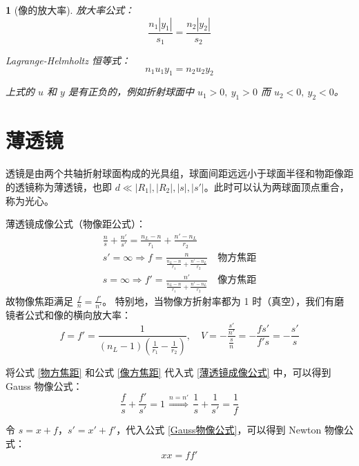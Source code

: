 \documentclass[UTF8]{report}
\theoremstyle{MyLineTheoremStyle} %
\theoremstyle{MyBlockTheoremStyle} %
\theoremstyle{MySubsubsectionStyle} %
\newtheorem{definition}{}
\begin{document}
\begin{definition}[像的放大率]
放大率公式：
\begin{equation}
\frac{n_1 | y_1 |}{s_1} = \frac{n_2 | y_2 |}{s_2}
\end{equation}

Lagrange-Helmholtz 恒等式：
\begin{equation}
n_1u_1y_1 = n_2u_2y_2
\end{equation}

上式的 $u$ 和 $y$ 是有正负的，例如折射球面中 $u_1 > 0,\ y_1 >0$ 而 $u_2 <0,\ y_2 < 0$。

\end{definition}



\section{薄透镜}

透镜是由两个共轴折射球面构成的光具组，球面间距远远小于球面半径和物距像距的透镜称为薄透镜，也即 $d \ll | R_1 |, | R_2 |, | s |, | s' |$。此时可以认为两球面顶点重合，称为光心。

薄透镜成像公式（物像距公式）：
\begin{gather} 
\frac{n}{s} + \frac{n'}{s'} = \frac{n_L - n}{r_1} + \frac{n' - n_L}{r_2} \label{薄透镜成像公式} \\
s' = \infty \Longrightarrow  f = \frac{n}{\frac{n_L - n}{r_1} + \frac{n' - n_L}{r_2}}\quad \text{物方焦距} \label{物方焦距} \\ 
s = \infty \Longrightarrow  f' = \frac{n'}{\frac{n_L - n}{r_1} + \frac{n' - n_L}{r_2}}\quad \text{像方焦距} \label{像方焦距}
\end{gather}
故物像焦距满足 $\frac{f}{n} = \frac{f'}{n'}$。
特别地，当物像方折射率都为 1 时（真空），我们有磨镜者公式和像的横向放大率：
\begin{equation}
f =f' = \frac{1}{(n_L - 1)(\frac{1}{r_1} - \frac{1}{r_2})},\quad  V = -\frac{\frac{s'}{n'}}{\frac{s}{n}} = -\frac{fs'}{f's} =  - \frac{s'}{s}
\end{equation}


将公式 \ref{物方焦距} 和公式 \ref{像方焦距} 代入式 \ref{薄透镜成像公式} 中，可以得到 Gauss 物像公式：
\begin{equation}
\frac{f}{s} + \frac{f'}{s'} = 1 \overset{n = n'}{\ \ \ \Longrightarrow\ \ \  } \frac{1}{s} + \frac{1}{s'} = \frac{1}{f}
\label{Gauss物像公式}
\end{equation}

令 $s = x + f$，$s' = x' + f'$，代入公式 \ref{Gauss物像公式}，可以得到 Newton 物像公式：
\begin{equation}
xx = ff'
\end{equation}
\end{document}
